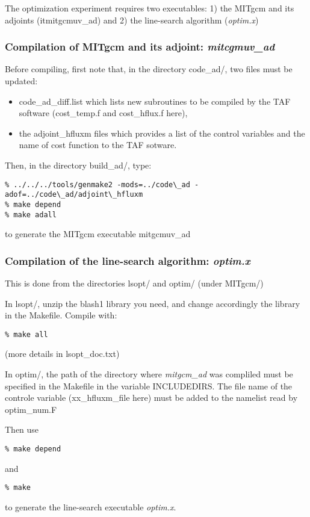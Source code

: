 The optimization experiment requires two executables: 1) the 
MITgcm and its adjoints (it{mitgcmuv\_ad}) and 2) the line-search
algorithm ({\it optim.x}) 

\subsubsection{Compilation of MITgcm and its adjoint: {\it mitcgmuv\_ad}}

Before compiling, first note that, in the directory code\_ad/, two files
must be updated:
\begin{itemize}
\item code\_ad\_diff.list which lists new subroutines to be compiled
by the TAF software (cost\_temp.f and cost\_hflux.f here),

\item  the adjoint\_hfluxm files which provides a list of the control variables
and the name of cost function to the TAF sotware.

\end{itemize}

Then, in the directory build\_ad/, type:
\begin{verbatim}
% ../../../tools/genmake2 -mods=../code\_ad -adof=../code\_ad/adjoint\_hfluxm
% make depend
% make adall
\end{verbatim}
to generate the MITgcm executable mitgcmuv\_ad

\subsubsection{Compilation of the line-search algorithm: {\it optim.x}}

This is done from the directories lsopt/ and optim/ (under MITgcm/)

In lsopt/, unzip the blash1 library you need, and change accordingly the
library in the Makefile. Compile with:
\begin{verbatim}
% make all
\end{verbatim}
(more details in lsopt\_doc.txt)

In optim/,  the path of the directory where {\it mitgcm\_ad} was compliled must be specified
in the Makefile in the variable INCLUDEDIRS. The file name of the controle variable
(xx\_hfluxm\_file here) must be added to the namelist read by optim\_num.F

Then use
\begin{verbatim}
% make depend
\end{verbatim} 
and
\begin{verbatim}
% make
\end{verbatim}
to generate the line-search executable {\it optim.x}.

